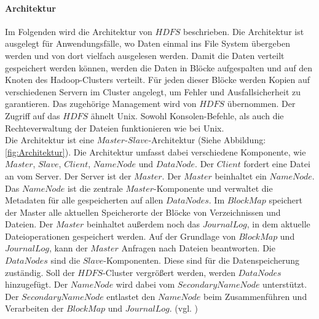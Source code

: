 \paragraph{Architektur}$\;$ \\
Im Folgenden wird die Architektur von $HDFS$ beschrieben. Die Architektur ist ausgelegt für Anwendungsfälle, wo Daten einmal ins File System übergeben werden und von dort vielfach ausgelesen werden. Damit die Daten verteilt gespeichert werden können, werden die Daten in Blöcke aufgespalten und auf den Knoten des Hadoop-Clusters verteilt. Für jeden dieser Blöcke werden Kopien auf verschiedenen Servern im Cluster angelegt, um Fehler und Ausfallsicherheit zu garantieren. Das zugehörige Management wird von $HDFS$ übernommen. Der Zugriff auf das $HDFS$ ähnelt Unix. Sowohl Konsolen-Befehle, als auch die Rechteverwaltung der Dateien funktionieren wie bei Unix.\\
Die Architektur ist eine $Master$-$Slave$-Architektur (Siehe Abbildung:\ref{fig:Architektur}). Die Architektur umfasst dabei verschiedene Komponente, wie $Master$, $Slave$, $Client$, $NameNode$ und $DataNode$. Der $Client$ fordert eine Datei an vom Server. Der Server ist der $Master$. Der $Master$ beinhaltet ein $NameNode$. Das $NameNode$ ist die zentrale $Master$-Komponente und verwaltet die Metadaten für alle gespeicherten auf allen $DataNodes$. Im $Block Map$ speichert der Master alle aktuellen Speicherorte der Blöcke von Verzeichnissen und Dateien. Der $Master$ beinhaltet außerdem noch das $Journal Log$, in dem aktuelle Dateioperationen gespeichert werden. Auf der Grundlage von $Block Map$ und $Journal Log$, kann der $Master$ Anfragen nach Dateien beantworten. Die $Data Nodes$ sind die $Slave$-Komponenten. Diese sind für die Datenspeicherung zuständig. Soll der $HDFS$-Cluster vergrößert werden, werden $DataNodes$ hinzugefügt. Der $NameNode$ wird dabei vom $SecondaryNameNode$ unterstützt. Der $SecondaryNameNode$ entlastet den $NameNode$ beim Zusammenführen und Verarbeiten der $Block Map$ und $Journal Log$. (vgl. \cite{uwe})
